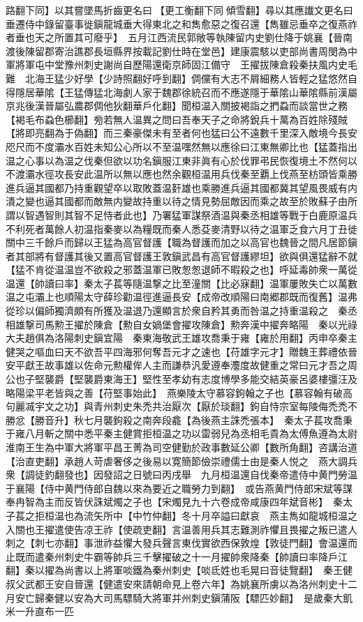路翻下同】以其嘗墜馬折齒更名曰【更工衡翻下同傾雪翻】尋以其應䜟文更名曰垂遷侍中錄留臺事徙鎭龍城垂大得東北之和雋愈惡之復召還【雋雖忌垂卒之復燕祚者垂也天之所置其可廢乎】　五月江西流民郭敞等執陳留内史劉仕降于姚襄【晉南渡後陳留郡寄治譙郡長垣縣界按載記劉仕時在堂邑】建康震駭以吏部尚書周閔為中軍將軍屯中堂豫州刺史謝尚自歷陽還衛京師固江備守　王擢拔陳倉殺秦扶風内史毛難　北海王猛少好學【少詩照翻好呼到翻】倜儻有大志不屑細務人皆輕之猛悠然自得隱居華隂【王猛傳猛北海劇人家于魏郡徐統召而不應遂隱于華隂山華隂縣前漢屬京兆後漢晉屬弘農郡倜他狄翻華戶化翻】聞桓温入關披褐詣之捫蝨而談當世之務【褐毛布蝨色櫛翻】㫄若無人温異之問曰吾奉天子之命將銳兵十萬為百姓除殘賊【將即亮翻為于偽翻】而三秦豪傑未有至者何也猛曰公不遠數千里深入敵境今長安咫尺而不度灞水百姓未知公心所以不至温嘿然無以應徐曰江東無卿比也【猛蓋指出温之心事以為温之伐秦但欲以功名鎭服江東非眞有心於伐罪弔民恢復境土不然何以不渡灞水徑攻長安此温所以無以應也然余觀桓温用兵伐秦至覇上伐燕至枋頭皆乘勝進兵逼其國都乃持重觀望卒以取敗蓋温姧雄也乘勝進兵逼其國都冀其望風畏威有内潰之變也逼其國都而敵無内變故持重以待之情見勢屈敵因而乘之故至於敗蘇子由所謂以智遇智則其智不足恃者此也】乃署猛軍謀祭酒温與秦丞相雄等戰于白鹿原温兵不利死者萬餘人初温指秦麥以為糧既而秦人悉芟麥清野以待之温軍乏食六月丁丑徙關中三千餘戶而歸以王猛為高官督護【職為督護而加之以高官也魏晉之間凡居節鎭者其部將有督護其後又置高官督護王敦鎭武昌有高官督護繆坦】欲與俱還猛辭不就【猛不肯從温温豈不欲殺之邪蓋温軍已敗怱怱退師不暇殺之也】呼延毒帥衆一萬從温還【帥讀曰率】秦太子萇等隨温撃之比至潼關【比必寐翻】温軍屢敗失亡以萬數温之屯灞上也順陽太守薛珍勸温徑進逼長安【成帝改順陽曰南郷郡既而復舊】温弗從珍以偏師獨濟頗有所獲及温退乃還顯言於衆自矜其勇而咎温之持重温殺之　秦丞相雄撃司馬勲王擢於陳倉【勲自女媧堡會擢攻陳倉】勲奔漢中擢奔略陽　秦以光祿大夫趙俱為洛陽刺史鎭宜陽　秦東海敬武王雄攻喬秉于雍【雍於用翻】丙申卒秦主健哭之嘔血曰天不欲吾平四海邪何奪吾元才之速也【苻雄字元才】贈魏王葬禮依晉安平獻王故事雄以佐命元勲權侔人主而謙恭汎愛遵奉灋度故健重之常曰元才吾之周公也子堅襲爵【堅襲爵東海王】堅性至孝幼有志度博學多能交結英豪呂婆樓彊汪及略陽梁平老皆與之善【苻堅事始此】　燕樂陵太守慕容鉤翰之子也【慕容翰有破高句麗㓕宇文之功】與青州刺史朱禿共治厭次【厭於琰翻】鉤自恃宗室每陵侮禿禿不勝忿【勝音升】秋七月襲鉤殺之南奔段龕【為後燕主誅禿張本】　秦太子萇攻喬秉于雍八月斬之關中悉平秦主健賞拒桓温之功以雷弱兒為丞相毛貴為太傅魚遵為太尉淮南王生為中軍大將軍平昌王菁為司空健勤於政事數延公卿【數所角翻】咨講治道【治直吏翻】承趙人苛虐奢侈之後易以寛簡節儉崇禮儒士由是秦人悦之　燕大調兵衆【調徒釣翻發也】因發詔之日號曰丙戌舉　九月桓温還自伐秦帝遣侍中黄門勞温于襄陽【侍中黄門侍郎自魏以來為要近之職勞力到翻】　或告燕黄門侍郎宋斌等謀奉冉智為主而反皆伏誅斌燭之子也【宋燭見九十六卷成帝咸康四年斌音彬】　秦太子萇之拒桓温也為流矢所中【中竹仲翻】冬十月卒謚曰獻哀　燕主雋如龍城桓温之入關也王擢遣使告凉王祚【使疏吏翻】言温善用兵其志難測祚懼且畏擢之叛已遣人刺之【刺七亦翻】事泄祚益懼大發兵聲言東伐實欲西保敦煌【敦徒門翻】會温還而止既而遣秦州刺史牛霸等帥兵三千擊擢破之十一月擢帥衆降秦【帥讀曰率降戶江翻】秦以擢為尚書以上將軍啖鐵為秦州刺史【啖氐姓也毛晃曰音徒覽翻】　秦王健叔父武都王安自晉還【健遣安來請朝命見上卷六年】為姚襄所虜以為洛州刺史十二月安亡歸秦健以安為大司馬驃騎大將軍并州刺史鎭蒲阪【驃匹妙翻】　是歲秦大飢米一升直布一匹

